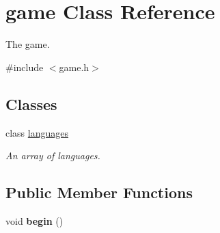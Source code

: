 \hypertarget{classgame}{}\section{game Class Reference}
\label{classgame}


The game.  




{\ttfamily \#include $<$game.\+h$>$}

\subsection*{Classes}
\begin{DoxyCompactItemize}
\item 
class \mbox{\hyperlink{classgame_1_1languages}{languages}}
\begin{DoxyCompactList}\small\item\em An array of languages. \end{DoxyCompactList}\end{DoxyCompactItemize}
\subsection*{Public Member Functions}
\begin{DoxyCompactItemize}
\item 
\mbox{\label{classgame_a0a81107150e7d981254c0c9609cf2b84}} 
void {\bfseries begin} ()
\end{DoxyCompactItemize}
